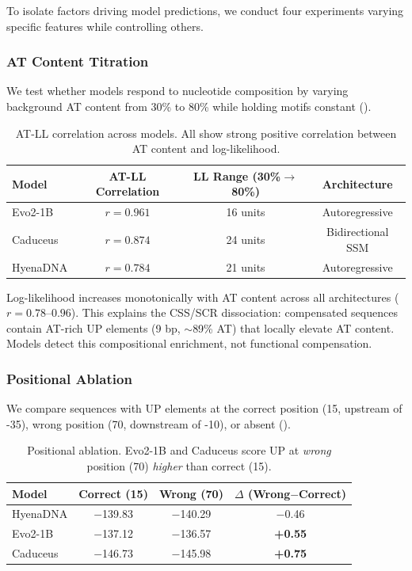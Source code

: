 \documentclass{article}
\begin{document}
To isolate factors driving model predictions, we conduct four experiments varying specific features while controlling others.

\subsubsection{AT Content Titration}

We test whether models respond to nucleotide composition by varying background AT content from 30\% to 80\% while holding motifs constant ().

\begin{table}[ht]
\caption{AT-LL correlation across models. All show strong positive correlation between AT content and log-likelihood.}
\label{tab:at_titration}
\vskip 0.05in
\begin{center}
\small
\begin{tabular}{lccc}
\toprule
Model & AT-LL Correlation & LL Range (30\%$\rightarrow$80\%) & Architecture \\
\midrule
Evo2-1B & $r = 0.961$ & 16 units & Autoregressive \\
Caduceus & $r = 0.874$ & 24 units & Bidirectional SSM \\
HyenaDNA & $r = 0.784$ & 21 units & Autoregressive \\
\bottomrule
\end{tabular}
\end{center}
\vskip -0.1in
\end{table}

Log-likelihood increases monotonically with AT content across all architectures ($r = 0.78$--$0.96$). This explains the CSS/SCR dissociation: compensated sequences contain AT-rich UP elements (9 bp, $\sim$89\% AT) that locally elevate AT content. Models detect this compositional enrichment, not functional compensation.

\subsubsection{Positional Ablation}

We compare sequences with UP elements at the correct position (15, upstream of -35), wrong position (70, downstream of -10), or absent ().

\begin{table}[ht]
\caption{Positional ablation. Evo2-1B and Caduceus score UP at \textit{wrong} position (70) \textit{higher} than correct (15).}
\label{tab:positional}
\vskip 0.05in
\begin{center}
\small
\begin{tabular}{lccc}
\toprule
Model & Correct (15) & Wrong (70) & $\Delta$ (Wrong$-$Correct) \\
\midrule
HyenaDNA & $-$139.83 & $-$140.29 & $-$0.46 \\
Evo2-1B & $-$137.12 & $-$136.57 & \textbf{+0.55} \\
Caduceus & $-$146.73 & $-$145.98 & \textbf{+0.75} \\
\bottomrule
\end{tabular}
\end{center}
\vskip -0.1in
\end{table}
\end{document}
